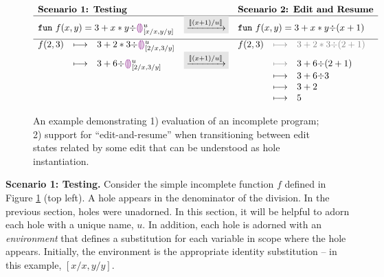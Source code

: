 \begin{figure}[ht]
\center
\ensuremath{
\begin{array}{rclcrcl}
\multicolumn{3}{l}{\textbf{\ScenerioOne: Testing}}
&
&
\multicolumn{3}{l}{\textbf{\ScenerioTwo: Edit and Resume}}
\\
\hline
\multicolumn{3}{l}{\texttt{fun}~f(x,y) = 3 + x * y {\div} \hehole{}^\metavar_{[x/x,y/y]}}
&
\multicolumn{1}{l}{
\colorbox{dVeryFaint}{$\xrightarrow{[\!| (x+1) / u |\!]}$}
}
&
\multicolumn{3}{l}{\texttt{fun}~f(x,y) = 3 + x * y {\div} (x+1)}
\\[2mm]
\hline
f(2,3) &\longmapsto & 3 + 2 * 3 {\div} \hehole{}^\metavar_{[2/x, 3/y]}
&
&
f(2,3) &{\color{gray} \longmapsto} & {\color{gray} 3 + 2 * 3 {\div} (2+1)}
\\
&\longmapsto& 3 + 6 {\div} \hehole{}^\metavar_{[2/x, 3/y]}
&
\multicolumn{1}{l}{
\colorbox{dVeryFaint}{$\xrightarrow{[\!| (x+1) / u |\!]}$}
}
&& {\color{gray} \longmapsto} & 3 + 6 {\div} (2 + 1)
\\
&&
&&& \longmapsto& 3 + 6 {\div} 3
\\
&&
&&& \longmapsto& 3 + 2
\\
&&
&&& \longmapsto& 5
\end{array}
}
\caption{An example demonstrating 1) evaluation of an incomplete program; 2) support for ``edit-and-resume'' when transitioning between edit states related by some edit that can be understood as hole instantiation.}
\label{fig:dynamics}
\end{figure}

\noindent\textbf{Scenario 1: Testing.} Consider the simple incomplete function $f$ defined in Figure \ref{fig:dynamics} (top left).  
%
A hole appears in the denominator of the division. In the previous section,
holes were unadorned. In this section, it will be helpful to adorn each hole with a unique name, $u$. In addition, each hole is adorned with an \emph{environment} that defines a substitution for each variable in scope
where the hole appears. Initially, the environment is the appropriate identity substitution -- in this example, $[x/x, y/y]$. 

